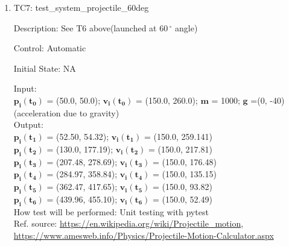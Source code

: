 \documentclass[12pt, titlepage]{article}
\begin{document}
\begin{enumerate}



\item{TC7: test\_system\_projectile\_60deg\\}

Description: See T6 above(launched at $60\,^{\circ}$ angle)

Control: Automatic

Initial State: NA

Input:\\
$\mathbf{p_i}$$\mathbf{(t_0)}$ = (50.0, 50.0); $\mathbf{v_i}$$\mathbf{(t_0)}$ = (150.0, 260.0); $\mathbf{m}$ = 1000; $\mathbf{g}$ =(0, -40) (acceleration due to gravity) \\

Output:\\
$\mathbf{p_i}$$\mathbf{(t_1)}$ = (52.50, 54.32);
$\mathbf{v_i}$$\mathbf{(t_1)}$ = (150.0, 259.141)\\
$\mathbf{p_i}$$\mathbf{(t_2)}$ = (130.0, 177.19);
$\mathbf{v_i}$$\mathbf{(t_2)}$ = (150.0, 217.81)\\
$\mathbf{p_i}$$\mathbf{(t_3)}$ = (207.48, 278.69);
$\mathbf{v_i}$$\mathbf{(t_3)}$ = (150.0, 176.48)\\
$\mathbf{p_i}$$\mathbf{(t_4)}$ = (284.97, 358.84);
$\mathbf{v_i}$$\mathbf{(t_4)}$ = (150.0, 135.15)\\ 
$\mathbf{p_i}$$\mathbf{(t_5)}$ = (362.47, 417.65);
$\mathbf{v_i}$$\mathbf{(t_5)}$ = (150.0, 93.82)\\ 
$\mathbf{p_i}$$\mathbf{(t_6)}$ = (439.96, 455.10);
$\mathbf{v_i}$$\mathbf{(t_6)}$ = (150.0, 52.49)\\  

How test will be performed: Unit testing with pytest\\
Ref. source:  \url{https://en.wikipedia.org/wiki/Projectile_motion},
\url{https://www.amesweb.info/Physics/Projectile-Motion-Calculator.aspx}
\end{enumerate}
\end{document}
